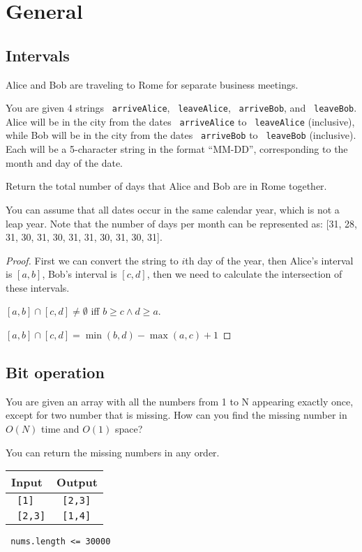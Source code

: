 \documentclass[11pt]{article}
\let\OldTexttt\texttt
\renewcommand{\texttt}[1]{\OldTexttt{\color{MidnightBlue} #1}}
\begin{document}
\section{General}
\label{sec:orgbf5dcdf}
\subsection{Intervals}
\label{sec:orgde2c8c6}
\begin{problem}
Alice and Bob are traveling to Rome for separate business meetings.

You are given 4 strings \texttt{arriveAlice}, \texttt{leaveAlice}, \texttt{arriveBob}, and \texttt{leaveBob}. Alice will be in the
city from the dates \texttt{arriveAlice} to \texttt{leaveAlice} (inclusive), while Bob will be in the city from
the dates \texttt{arriveBob} to \texttt{leaveBob} (inclusive). Each will be a 5-character string in the format
``MM-DD'', corresponding to the month and day of the date.

Return the total number of days that Alice and Bob are in Rome together.

You can assume that all dates occur in the same calendar year, which is not a leap year. Note
that the number of days  per month can be represented as: [31, 28, 31, 30, 31, 30, 31, 31, 30, 31, 30, 31].
\end{problem}

\begin{proof}
First we can convert the string to \(i\)th day of the year, then Alice's interval is \([a,b]\),
Bob's interval is \([c,d]\), then we need to calculate the intersection of these intervals.

\([a,b]\cap[c,d]\neq\emptyset\) iff \(b\ge c\wedge d\ge a\).

\([a,b]\cap[c,d]=\min(b,d)-\max(a,c)+1\)
\end{proof}

\subsection{Bit operation}
\label{sec:org5cf1463}
\begin{problem}
You are given an array with all the numbers from 1 to N appearing exactly once, except for two
number that is missing. How can you find the missing number in \(O(N)\) time and \(O(1)\) space?

You can return the missing numbers in any order.

\begin{center}
\begin{tabular}{ll}
Input & Output\\
\hline
\texttt{[1]} & \texttt{[2,3]}\\
\texttt{[2,3]} & \texttt{[1,4]}\\
\end{tabular}
\end{center}


\texttt{nums.length <= 30000}
\end{problem}
\end{document}
